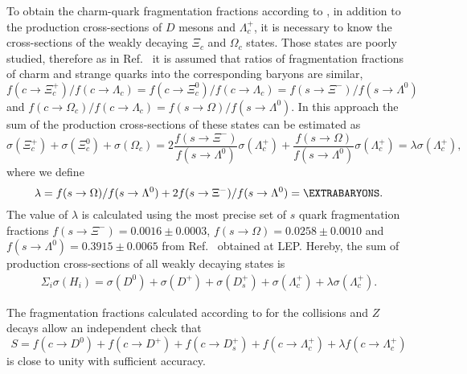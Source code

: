 To obtain the charm-quark fragmentation fractions according to 
, in addition to the production cross-sections of $D$ 
mesons and $\Lambda_c^{+}$, it is necessary to know the cross-sections 
of the weakly decaying $\Xi_c$ and $\Omega_c$ states.
%
Those states are poorly studied, therefore as in 
Ref.~\cite{Alexander:1996wy} it is assumed that ratios of fragmentation 
fractions of charm and strange quarks into the corresponding baryons are 
similar,
 $f(c\rightarrow \Xi_c^+)/f(c\rightarrow \Lambda_c)=
  f(c\rightarrow \Xi_c^0)/f(c\rightarrow \Lambda_c)=
  f(s\rightarrow \Xi^{-})/f(s\rightarrow \Lambda^0)$
and  
 $f(c\rightarrow \Omega_c)/f(c\rightarrow \Lambda_c)=
  f(s\rightarrow \Omega)/f(s\rightarrow \Lambda^0).
  $
%
In this approach the sum of the production cross-sections of these states can be estimated
as
\begin{equation}
\sigma(\Xi_c^+)+\sigma(\Xi_c^0)+\sigma(\Omega_c)=
2\frac{f(s\rightarrow \Xi^{-})}{f(s\rightarrow \Lambda^0)}\sigma(\Lambda_{c}^{+})
+\frac{f(s\rightarrow \Omega)}{f(s\rightarrow \Lambda^0)}\sigma(\Lambda_{c}^{+})
=\lambda\sigma(\Lambda_{c}^{+}),
\end{equation}
where we define
\begin{equation}
\lambda=f(s\rightarrow \Omega)/f(s\rightarrow \Lambda^0)+2f(s\rightarrow 
 \Xi^{-})/f(s\rightarrow \Lambda^0)=\EXTRABARYONS.
\end{equation}
The  value of $\lambda$ is 
calculated using the most precise set of $s$ quark fragmentation 
fractions
$f(s\rightarrow \Xi^{-})=0.0016\pm 0.0003$,
$f(s\rightarrow \Omega)=0.0258\pm 0.0010$ and 
$f(s\rightarrow \Lambda^0)=0.3915\pm 0.0065$ from Ref.~\cite{PDG2014} 
obtained at LEP.
Hereby, the sum of production cross-sections of all weakly decaying 
states is
\begin{equation}
\begin{split}
\label{eq:lambda}
\Sigma_{i}\sigma(H_{i})=\sigma(D^0)+\sigma(D^+)+\sigma(D_s^+)+
\sigma(\Lambda_{c}^{+})+\lambda \sigma(\Lambda_{c}^{+}).
\end{split}
\end{equation}

The fragmentation fractions calculated according to  
for the \epem collisions and $Z$ decays 
allow an independent check that
\begin{equation}\label{eq:ffsumisone}
S=f(c\rightarrow D^0)+f(c\rightarrow D^+)+f(c\rightarrow D_s^+)+
f(c\rightarrow \Lambda_{c}^{+})+\lambda f(c\rightarrow \Lambda_{c}^{+})
\end{equation}
is close to unity with sufficient accuracy.
%
